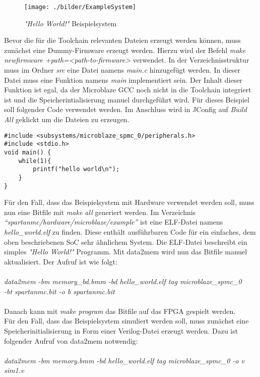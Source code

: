 \begin{figure}[th!]
\centering
\texttt{[image: ./bilder/ExampleSystem]}
\caption{\textit{"Hello World!"} Beispielsystem}
\label{fig:ExampleSystem}
\end{figure}
\noindent
Bevor die für die Toolchain relevanten Dateien erzeugt werden können, muss zunächst eine Dummy-Firmware erzeugt werden. Hierzu wird der Befehl \textit{make newfirmware +path=<path-to-firmware>} verwendet. In der Verzeichnisstruktur muss im Ordner \textit{src} eine Datei namens \textit{main.c} hinzugefügt werden. In dieser Datei muss eine Funktion namens \textit{main} implementiert sein. Der Inhalt dieser Funktion ist egal, da der Microblaze GCC noch nicht in die Toolchain integriert ist und die Speicherintialisierung manuel durchgeführt wird. Für dieses Beispiel soll folgender Code verwendet werden. Im Anschluss wird in JConfig auf \textit{Build All} geklickt um die Dateien zu erzeugen.
\begin{lstlisting}
#include <subsystems/microblaze_spmc_0/peripherals.h>
#include <stdio.h>
void main() {
	while(1){
		printf("hello world\n");
	}
}
\end{lstlisting}
Für den Fall, dass das Beispielsystem mit Hardware verwendet werden soll, muss nun eine Bitfile mit \textit{make all} generiert werden. Im Verzeichnis \textit{``spartanmc/hardware/microblaze/example''} ist eine ELF-Datei namens \textit{hello\_world.elf} zu finden. Diese enthält ausführbaren Code für ein einfaches, dem oben beschriebenen SoC sehr ähnlichem System. Die ELF-Datei beschreibt ein simples \textit{"Hello World!"} Programm. Mit data2mem wird nun das Bitfile manuel aktualisiert. Der Aufruf ist wie folgt:\\\\
\indent
\textit{data2mem -bm memory\_bd.bmm -bd hello\_world.elf tag microblaze\_spmc\_0\\
\indent \indent \indent -bt spartanmc.bit -o b spartanmc.bit}\\\\
Danach kann mit \textit{make program} das Bitfile auf das FPGA gespielt werden.\\
Für den Fall, dass das Beispielsystem simuliert werden soll, muss zunächst eine Speicherinitialisierung in Form einer Verilog-Datei erzeugt werden. Dazu ist folgender Aufruf von data2mem notwendig:\\\\
\indent
\textit{data2mem -bm memory.bmm -bd hello\_world.elf tag microblaze\_spmc\_0 -o v sim1.v}\\\\
